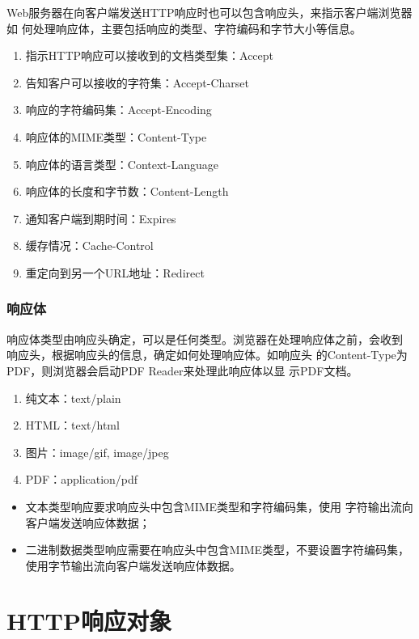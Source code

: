 Web服务器在向客户端发送HTTP响应时也可以包含响应头，来指示客户端浏览器如
何处理响应体，主要包括响应的类型、字符编码和字节大小等信息。


\begin{enumerate}
\item 指示HTTP响应可以接收到的文档类型集：Accept
\item 告知客户可以接收的字符集：Accept-Charset
\item 响应的字符编码集：Accept-Encoding
\item 响应体的MIME类型：Content-Type
\item 响应体的语言类型：Context-Language
\item 响应体的长度和字节数：Content-Length
\item 通知客户端到期时间：Expires
\item 缓存情况：Cache-Control
\item 重定向到另一个URL地址：Redirect
\end{enumerate}

\subsubsection{响应体} 

响应体类型由响应头确定，可以是任何类型。浏览器在处理响应体之前，会收到
响应头，根据响应头的信息，确定如何处理响应体。{\kai\Red 如响应头
  的Content-Type为PDF，则浏览器会启动PDF Reader来处理此响应体以显
  示PDF文档。}


\begin{enumerate}
\item 纯文本：text/plain
\item HTML：text/html
\item 图片：image/gif, image/jpeg
\item PDF：application/pdf
\end{enumerate}


\begin{itemize}
\item 文本类型响应要求响应头中包含MIME类型和字符编码集，使用{\hei\Red
    字符输出流}向客户端发送响应体数据；
\item 二进制数据类型响应需要在响应头中包含MIME类型，不要设置字符编码集，
  使用{\hei\Blue 字节输出流}向客户端发送响应体数据。
\end{itemize}

\section{HTTP响应对象}

